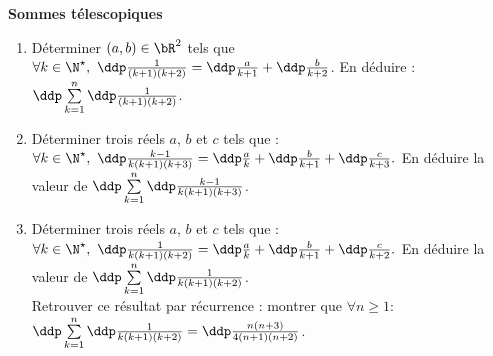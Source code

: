 
\begin{exercice}  \; \textbf{Sommes t\'elescopiques}
\begin{enumerate}
\item D\'eterminer $(a,b)\in\bR^2$ tels que $\forall k\in\N^{\star}, \ \ddp\frac{1}{(k+1)(k+2)}=\ddp\frac{a}{k+1}+\ddp\frac{b}{k+2}$. En d\'eduire : $\ddp \sum\limits_{k=1}^n \ddp\frac{1}{(k+1)(k+2)} $. 
\item D\'eterminer trois r\'eels $a$, $b$ et $c$ tels que : $\forall k\in\N^{\star},\ \ddp\frac{k-1}{k(k+1)(k+3)}=\ddp\frac{a}{k}+\ddp\frac{b}{k+1}+\ddp\frac{c}{k+3}.$ En d\'eduire la valeur de $\ddp \sum\limits_{k=1}^{n}  \ddp\frac{k-1}{k(k+1)(k+3)}$.
\item D\'eterminer trois r\'eels $a$, $b$ et $c$ tels que : $\forall k\in\N^{\star},\ \ddp\frac{1}{k(k+1)(k+2)}=\ddp\frac{a}{k}+\ddp\frac{b}{k+1}+\ddp\frac{c}{k+2}.$ En d\'eduire la valeur de $\ddp \sum\limits_{k=1}^{n}  \ddp\frac{1}{k(k+1)(k+2)}$.\\
Retrouver ce r\'esultat par r\'ecurrence : montrer que $\forall n\geq 1$: $\ddp \sum\limits_{k=1}^{n} \ddp\frac{1}{k(k+1)(k+2)}=\ddp\frac{n(n+3)}{4(n+1)(n+2)}$.
\end{enumerate}
\end{exercice}